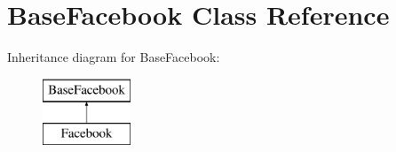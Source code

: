 \hypertarget{class_base_facebook}{\section{Base\-Facebook Class Reference}
\label{class_base_facebook}
}
Inheritance diagram for Base\-Facebook\-:\begin{figure}[H]
\begin{center}
\leavevmode
\includegraphics[height=2.000000cm]{class_base_facebook}
\end{center}
\end{figure}
